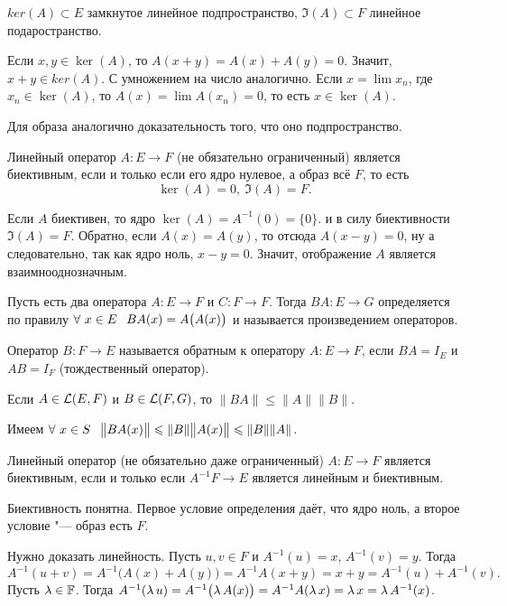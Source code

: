 \begin{Ut}
 $ker(A)\subset E$ замкнутое линейное подпространство, $\Im(A)\subset F$ линейное подаространство.
\end{Ut}
\begin{Proof}
 Если $x,y\in \ker(A)$, то $A(x+y) = A(x) + A(y)=0$. Значит, $x+y \in ker(A)$. С умножением на число аналогично. Если $x = \lim x_n$, где $x_n\in \ker(A)$, то $A(x) = \lim A(x_n)=0$, то есть $x\in \ker(A)$.

Для образа аналогично доказательность того, что оно подпространство.
\end{Proof}
\begin{Ut}
  Линейный оператор $A\colon E\to F$ (не обязательно ограниченный) является биективным, если и только если его ядро нулевое, а образ всё $F$, то есть
\[
  \ker(A) = 0,\ \Im(A)=F.
\]
\end{Ut}
\begin{Proof}
Если $A$ биективен, то ядро $\ker(A) = A^{-1}(0) = \{0\}$.  и в силу биективности $\Im(A)=F$. Обратно, если $A(x) = A(y)$, то отсюда $A(x-y)=0$, ну а следовательно, так как ядро ноль, $x-y=0$. Значит, отображение $A$ является взаимнооднозначным.
\end{Proof}
\begin{Def}
  Пусть есть два оператора $A\colon E\to F$ и $C\colon F\to F$. Тогда $BA\colon E\to G$ определяется по правилу $\forall\ x\in E\pau BA(x) = A\big(A(x)\big)$ и называется произведением операторов.
\end{Def}
\begin{Def}
Оператор $B\colon F\to E$ называется обратным к оператору $A\colon E\to F$, если $BA = I_E$ и $AB = I_F$ (тождественный оператор).
\end{Def}
\begin{Ut}
  Если $A\in \mathcal L(E,F)$ и $B\in\mathcal L(F,G)$, то $\|BA\|\le \|A\|\|B\|$.
\end{Ut}
\begin{Proof}
  Имеем $\forall\ x\in S\hskip .75em plus.1em minus.08em\relax \big\|BA(x)\big\|\leqslant\|B\|\big\|A(x)\big\|\leqslant \|B\|\|A\|$.
\end{Proof}
\begin{Ut}
  Линейный оператор (не обязательно даже ограниченный) $A\colon E\to F$ является биективным, если и только если $A^{-1}F\to E$ является линейным и биективным.
\end{Ut}
\begin{Proof}
Биективность понятна. Первое условие определения даёт, что ядро ноль, а второе условие "--- образ есть $F$. 

Нужно доказать линейность. Пусть $u,v\in F$ и $A^{-1}(u) = x$, $A^{-1}(v)=y$. Тогда
\[
  A^{-1}(u+v) = A^{-1}\big(A(x) + A(y)\big) = A^{-1}A(x+y) = x+y = A^{-1}(u) + A^{-1}(v).
\]
Пусть $\lambda\in\mathbb F$. Тогда $A^{-1}(\lambda\,u) = A^{-1}\big(\lambda\,A(x)\big) = A^{-1}A(\lambda\,x) = \lambda\, x = \lambda\,A^{-1}(x)$.
\end{Proof}

